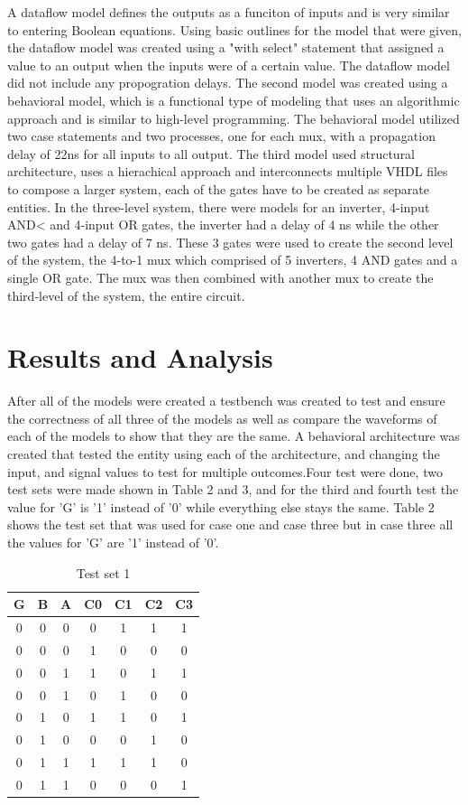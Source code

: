 \documentclass[CMPE]{KGCOEReport}
\begin{document}
 A dataflow model defines the outputs as a funciton of inputs and is very similar to entering Boolean equations. Using basic outlines for the model that were given, the dataflow model was created using a "with select" statement that assigned a value to an output when the inputs were of a certain value. The dataflow model did not include any propogration delays.  The second model was created using a behavioral model, which is a functional type of modeling that uses an algorithmic approach and is similar to high-level programming. The behavioral model utilized two case statements and two processes, one for each mux, with a propagation delay of 22ns for all inputs to all output. The third model used structural architecture, uses a hierachical approach and interconnects multiple VHDL files to compose a larger system, each of the gates have to be created as separate entities. In the three-level system, there were models for an inverter, 4-input AND< and 4-input OR gates, the inverter had a delay of 4 ns while the other two gates had a delay of 7 ns. These 3 gates were used to create the second level of the system, the 4-to-1 mux which comprised of 5 inverters, 4 AND gates and a single OR gate. The mux was then combined with another mux to create the third-level of the system, the entire circuit. 

\section*{Results and Analysis} 
After all of the models were created a testbench was created to test and ensure the correctness of all three of the models as well as compare the waveforms of each of the models to show that they are the same. A behavioral architecture was created that tested the entity using each of the architecture, and changing the input, and signal values to test for multiple outcomes.Four test were done, two test sets were made shown in Table 2 and 3, and for the third and fourth test the value for 'G' is '1' instead of '0' while everything else stays the same. Table 2 shows the test set that was used for case one and case three but in case three all the values for 'G' are '1' instead of '0'.

\begin{table}[H]
	\centering
	\caption{Test set 1}
	\label{tab:Table 2}
	\begin{tabular}{|c|c|c|c c c c|}
		\hline
		G & B & A & C0 & C1 & C2 & C3 \\ \hline
		0 & 0 & 0 & 0 & 1 & 1 & 1 \\ \hline
		0 & 0 & 0 & 1 & 0 & 0 & 0 \\ \hline
		0 & 0 & 1 & 1 & 0 & 1 & 1 \\ \hline
		0 & 0 & 1 & 0 & 1 & 0 & 0 \\ \hline
		0 & 1 & 0 & 1 & 1 & 0 & 1 \\ \hline
		0 & 1 & 0 & 0 & 0 & 1 & 0 \\ \hline
		0 & 1 & 1 & 1 & 1 & 1 & 0 \\ \hline
		0 & 1 & 1 & 0 & 0 & 0 & 1 \\ \hline
	\end{tabular}
\end{table}
\end{document}

